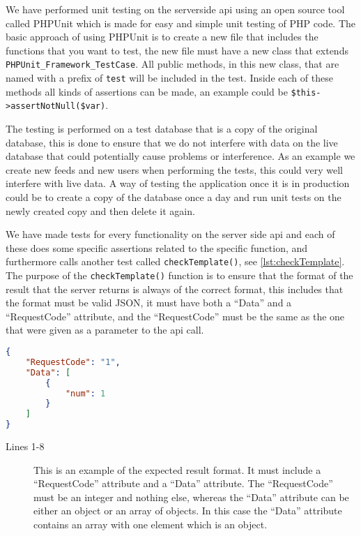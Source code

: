 We have performed unit testing on the serverside \ac{api} using an open source tool called PHPUnit which is made for easy and simple unit testing of PHP code. The basic approach of using PHPUnit is to create a new file that includes the functions that you want to test, the new file must have a new class that extends \lstinline|PHPUnit_Framework_TestCase|. All public methods, in this new class, that are named with a prefix of \lstinline|test| will be included in the test. Inside each of these methods all kinds of assertions can be made, an example could be \lstinline|$this->assertNotNull($var)|\citep{phpunit}.

The testing is performed on a test database that is a copy of the original database, this is done to ensure that we do not interfere with data on the live database that could potentially cause problems or interference. As an example we create new feeds and new users when performing the tests, this could very well interfere with live data. A way of testing the application once it is in production could be to create a copy of the database once a day and run unit tests on the newly created copy and then delete it again.

We have made tests for every functionality on the server side \ac{api} and each of these does some specific assertions related to the specific function, and furthermore calls another test called \lstinline|checkTemplate()|, see \autoref{lst:checkTemplate}. The purpose of the \lstinline|checkTemplate()| function is to ensure that the format of the result that the server returns is always of the correct format, this includes that the format must be valid JSON, it must have both a ``Data'' and a ``RequestCode'' attribute, and the ``RequestCode'' must be the same as the one that were given as a parameter to the \ac{api} call.

\begin{lstlisting}[language=json, label=lst:jsonFormat, caption={JSON format, in this case an example of the result from \lstinline|CheckFeeds|}]
{
    "RequestCode": "1",
    "Data": [
        {
            "num": 1
        }
    ]
}
\end{lstlisting}
\begin{description}
\item[Lines 1-8] This is an example of the expected result format. It must include a ``RequestCode'' attribute and a ``Data'' attribute. The ``RequestCode'' must be an integer and nothing else, whereas the ``Data'' attribute can be either an object or an array of objects. In this case the ``Data'' attribute contains an array with one element which is an object.
\end{description}

